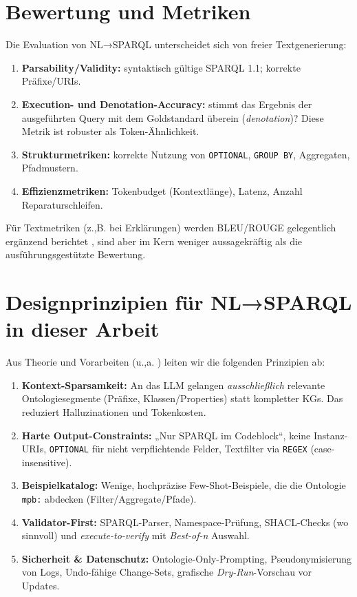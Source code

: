 \section{Bewertung und Metriken}
\label{sec:LLM-Evaluation}

Die Evaluation von NL→SPARQL unterscheidet sich von freier Textgenerierung:
\begin{enumerate}
\item \textbf{Parsability/Validity:} syntaktisch gültige SPARQL 1.1; korrekte Präfixe/URIs.
\item \textbf{Execution- und Denotation-Accuracy:} stimmt das Ergebnis der ausgeführten Query mit dem Goldstandard überein (\emph{denotation})? Diese Metrik ist robuster als Token-Ähnlichkeit.
\item \textbf{Strukturmetriken:} korrekte Nutzung von \texttt{OPTIONAL}, \texttt{GROUP BY}, Aggregaten, Pfadmustern.
\item \textbf{Effizienzmetriken:} Tokenbudget (Kontextlänge), Latenz, Anzahl Reparaturschleifen.
\end{enumerate}
Für Textmetriken (z.,B. bei Erklärungen) werden BLEU/ROUGE gelegentlich ergänzend berichtet \cite{papineni2002bleu,lin2004rouge}, sind aber im Kern weniger aussagekräftig als die ausführungsgestützte Bewertung.

\section{Designprinzipien für NL→SPARQL in dieser Arbeit}
\label{sec:LLM-Designprinzipien}

Aus Theorie und Vorarbeiten (u.,a. \cite{avila2024text2sparql}) leiten wir die folgenden Prinzipien ab:
\begin{enumerate}
\item \textbf{Kontext-Sparsamkeit:} An das LLM gelangen \emph{ausschließlich} relevante Ontologiesegmente (Präfixe, Klassen/Properties) statt kompletter KGs. Das reduziert Halluzinationen und Tokenkosten.
\item \textbf{Harte Output-Constraints:} „Nur SPARQL im Codeblock“, keine Instanz-URIs, \texttt{OPTIONAL} für nicht verpflichtende Felder, Textfilter via \texttt{REGEX} (case-insensitive).
\item \textbf{Beispielkatalog:} Wenige, hochpräzise Few-Shot-Beispiele, die die Ontologie \texttt{mpb:} abdecken (Filter/Aggregate/Pfade).
\item \textbf{Validator-First:} SPARQL-Parser, Namespace-Prüfung, SHACL-Checks (wo sinnvoll) und \emph{execute-to-verify} mit \emph{Best-of-n} Auswahl.
\item \textbf{Sicherheit & Datenschutz:} Ontologie-Only-Prompting, Pseudonymisierung von Logs, Undo-fähige Change-Sets, grafische \emph{Dry-Run}-Vorschau vor Updates.
\end{enumerate}

